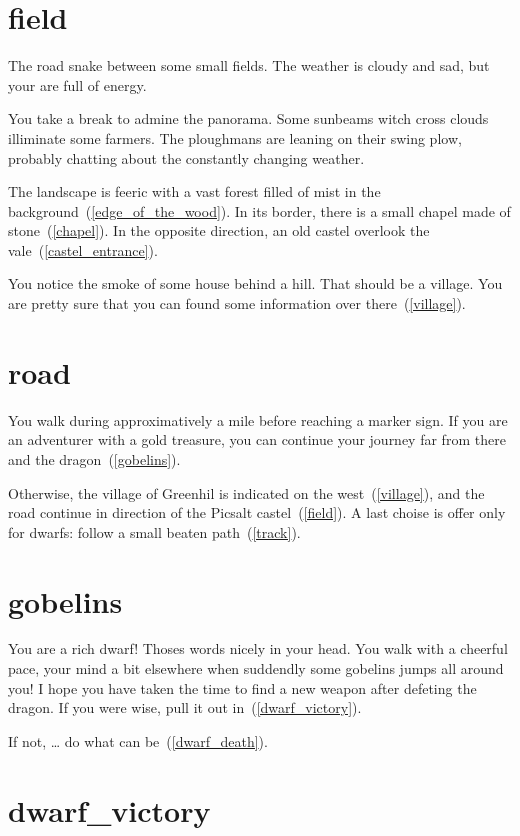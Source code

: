 
\section{field}

The road snake between some small fields. The weather is cloudy and sad, but
your are full of energy.

You take a break to admine the panorama. Some sunbeams witch cross clouds
illiminate some farmers. The ploughmans are leaning on their swing plow,
probably chatting about the constantly changing weather.

The landscape is feeric with a vast forest filled of mist in the
background~(\ref{edge_of_the_wood}). In its border, there is a small chapel made
of stone~(\ref{chapel}). In the opposite direction, an old castel overlook the
vale~(\ref{castel_entrance}).

You notice the smoke of some house behind a hill. That should be a village. You
are pretty sure that you can found some information over there~(\ref{village}).

\section{road}

You walk during approximatively a mile before reaching a marker sign. If you are
an adventurer with a gold treasure, you can continue your journey far from there and
the dragon~(\ref{gobelins}).

Otherwise, the village of Greenhil is indicated on the west~(\ref{village}), and
the road continue in direction of the Picsalt castel~(\ref{field}). A last
choise is offer only for dwarfs: follow a small beaten path~(\ref{track}).

\section{gobelins}

You are a rich dwarf! Thoses words nicely in your head. You walk with a cheerful
pace, your mind a bit elsewhere when suddendly some gobelins jumps all around
you! I hope you have taken the time to find a new weapon after defeting the dragon. If
you were wise, pull it out in~(\ref{dwarf_victory}).

If not, … do what can be~(\ref{dwarf_death}).

\section{dwarf_victory}

